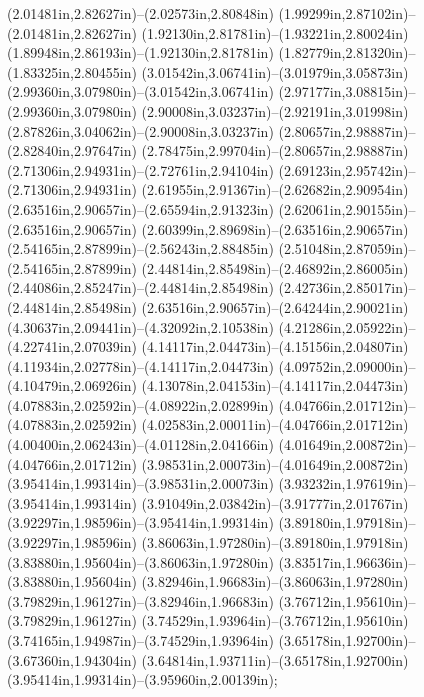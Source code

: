 (2.01481in,2.82627in)--(2.02573in,2.80848in) (1.99299in,2.87102in)--(2.01481in,2.82627in) (1.92130in,2.81781in)--(1.93221in,2.80024in) (1.89948in,2.86193in)--(1.92130in,2.81781in) (1.82779in,2.81320in)--(1.83325in,2.80455in) (3.01542in,3.06741in)--(3.01979in,3.05873in) (2.99360in,3.07980in)--(3.01542in,3.06741in) (2.97177in,3.08815in)--(2.99360in,3.07980in) (2.90008in,3.03237in)--(2.92191in,3.01998in) (2.87826in,3.04062in)--(2.90008in,3.03237in) (2.80657in,2.98887in)--(2.82840in,2.97647in) (2.78475in,2.99704in)--(2.80657in,2.98887in) (2.71306in,2.94931in)--(2.72761in,2.94104in) (2.69123in,2.95742in)--(2.71306in,2.94931in) (2.61955in,2.91367in)--(2.62682in,2.90954in) (2.63516in,2.90657in)--(2.65594in,2.91323in) (2.62061in,2.90155in)--(2.63516in,2.90657in) (2.60399in,2.89698in)--(2.63516in,2.90657in) (2.54165in,2.87899in)--(2.56243in,2.88485in) (2.51048in,2.87059in)--(2.54165in,2.87899in) (2.44814in,2.85498in)--(2.46892in,2.86005in) (2.44086in,2.85247in)--(2.44814in,2.85498in) (2.42736in,2.85017in)--(2.44814in,2.85498in) (2.63516in,2.90657in)--(2.64244in,2.90021in) (4.30637in,2.09441in)--(4.32092in,2.10538in) (4.21286in,2.05922in)--(4.22741in,2.07039in) (4.14117in,2.04473in)--(4.15156in,2.04807in) (4.11934in,2.02778in)--(4.14117in,2.04473in) (4.09752in,2.09000in)--(4.10479in,2.06926in) (4.13078in,2.04153in)--(4.14117in,2.04473in) (4.07883in,2.02592in)--(4.08922in,2.02899in) (4.04766in,2.01712in)--(4.07883in,2.02592in) (4.02583in,2.00011in)--(4.04766in,2.01712in) (4.00400in,2.06243in)--(4.01128in,2.04166in) (4.01649in,2.00872in)--(4.04766in,2.01712in) (3.98531in,2.00073in)--(4.01649in,2.00872in) (3.95414in,1.99314in)--(3.98531in,2.00073in) (3.93232in,1.97619in)--(3.95414in,1.99314in) (3.91049in,2.03842in)--(3.91777in,2.01767in) (3.92297in,1.98596in)--(3.95414in,1.99314in) (3.89180in,1.97918in)--(3.92297in,1.98596in) (3.86063in,1.97280in)--(3.89180in,1.97918in) (3.83880in,1.95604in)--(3.86063in,1.97280in) (3.83517in,1.96636in)--(3.83880in,1.95604in) (3.82946in,1.96683in)--(3.86063in,1.97280in) (3.79829in,1.96127in)--(3.82946in,1.96683in) (3.76712in,1.95610in)--(3.79829in,1.96127in) (3.74529in,1.93964in)--(3.76712in,1.95610in) (3.74165in,1.94987in)--(3.74529in,1.93964in) (3.65178in,1.92700in)--(3.67360in,1.94304in) (3.64814in,1.93711in)--(3.65178in,1.92700in) (3.95414in,1.99314in)--(3.95960in,2.00139in);
